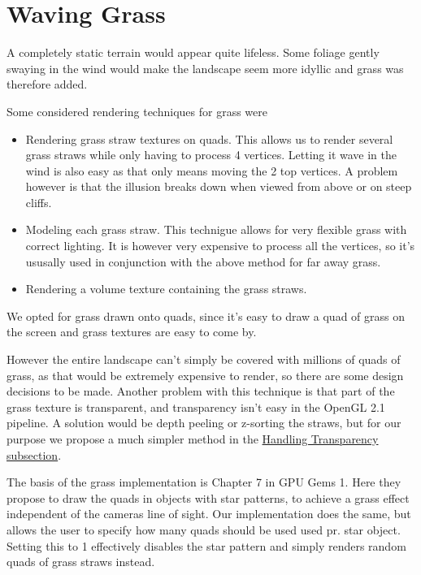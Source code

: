 \chapter{Waving Grass}


A completely static terrain would appear quite lifeless. Some foliage
gently swaying in the wind would make the landscape seem more idyllic
and grass was therefore added.

Some considered rendering techniques for grass were

\begin{itemize}
\item Rendering grass straw textures on quads. This allows us to
  render several grass straws while only having to process 4
  vertices. Letting it wave in the wind is also easy as that only
  means moving the 2 top vertices. A problem however is that the
  illusion breaks down when viewed from above or on steep cliffs.
\item Modeling each grass straw. This technigue allows for very
  flexible grass with correct lighting. It is however very expensive
  to process all the vertices, so it's ususally used in conjunction
  with the above method for far away grass.
\item Rendering a volume texture containing the grass straws.
\end{itemize}

We opted for grass drawn onto quads, since it's easy to draw a quad of
grass on the screen and grass textures are easy to come by.

However the entire landscape can't simply be covered with millions of
quads of grass, as that would be extremely expensive to render, so
there are some design decisions to be made. Another problem with this
technique is that part of the grass texture is transparent, and
transparency isn't easy in the OpenGL 2.1 pipeline. A solution would
be depth peeling or z-sorting the straws, but for our purpose we
propose a much simpler method in the
\hyperref[sec:transparency]{Handling Transparency subsection}.


The basis of the grass implementation is Chapter 7 in GPU Gems 1. Here
they propose to draw the quads in objects with star patterns, to
achieve a grass effect independent of the cameras line of sight. Our
implementation does the same, but allows the user to specify how many
quads should be used used pr. star object. Setting this to 1
effectively disables the star pattern and simply renders random quads
of grass straws instead.


